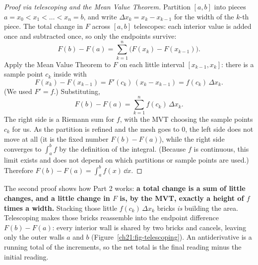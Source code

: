\begin{proof}[Proof via telescoping and the Mean Value Theorem]
Partition $[a,b]$ into pieces $a=x_0<x_1<\dots<x_n=b$, and write
$\Delta x_k = x_k-x_{k-1}$ for the width of the $k$-th piece. The total change in $F$
across $[a,b]$ telescopes: each interior value is added once and subtracted
once, so only the endpoints survive:
\[
  F(b)-F(a) = \sum_{k=1}^{n}\big(F(x_k)-F(x_{k-1})\big).
\]
Apply the Mean Value Theorem to $F$ on each little interval $[x_{k-1},x_k]$:
there is a sample point $c_k$ inside with
\[
  F(x_k)-F(x_{k-1}) = F'(c_k)\,(x_k-x_{k-1}) = f(c_k)\,\Delta x_k .
\]
(We used $F'=f$.) Substituting,
\[
  F(b)-F(a) = \sum_{k=1}^{n} f(c_k)\,\Delta x_k .
\]
The right side is a Riemann sum for $f$, with the MVT choosing the
sample points $c_k$ for us. As the partition is refined and the mesh goes to $0$, the
left side does not move at all (it is the fixed number $F(b)-F(a)$), while the
right side converges to $\int_a^b f$ by the definition of the integral. (Because
$f$ is continuous, this limit exists and does not depend on which partitions or
sample points are used.) Therefore
$F(b)-F(a)=\int_a^b f(x)\,\dd x$.
\end{proof}

\begin{whybox}
The second proof shows how Part 2 works: \textbf{a total change is
a sum of little changes, and a little change in $F$ is, by the MVT, exactly a
height of $f$ times a width.} Stacking those little $f(c_k)\,\Delta x_k$ bricks
\emph{is} building the area. Telescoping makes those bricks reassemble
into the endpoint difference $F(b)-F(a)$: every interior wall is shared by
two bricks and cancels, leaving only the outer walls $a$ and $b$
(Figure~\ref{ch21:fig-telescoping}). An antiderivative is a running total of the
increments, so the net total is the final reading minus the initial reading.
\end{whybox}

